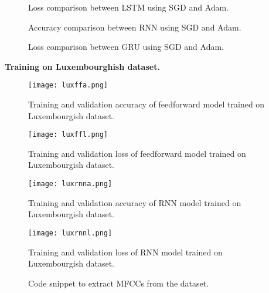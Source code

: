     \begin{figure}[H]
      \centering
      \qquad
      \caption{Loss comparison between LSTM using SGD and Adam.}%
      \label{lstml}
    \end{figure}
    \begin{figure}[H]
      \centering
      \qquad
      \caption{Accuracy comparison between RNN using SGD and Adam.}%
      \label{grua}
    \end{figure}
    \begin{figure}[H]
      \centering
      \qquad
      \caption{Loss comparison between GRU using SGD and Adam.}%
      \label{grul}
    \end{figure}

 \newpage

\textbf{Training on Luxembourghish dataset.}\\
\begin{figure}[h]
  \centering
  \texttt{[image: luxffa.png]}
  \caption{Training and validation accuracy of feedforward model trained on
  Luxembourgish dataset.}
  \label{grua}
\end{figure}

\begin{figure}[h]
  \centering
  \texttt{[image: luxffl.png]}
  \caption{Training and validation loss of feedforward model trained on
  Luxembourgish dataset.}
  \label{grul}
\end{figure}

\begin{figure}[h]
  \centering
  \texttt{[image: luxrnna.png]}
  \caption{Training and validation accuracy of RNN model trained on
  Luxembourgish dataset.}
  \label{grua}
\end{figure}

\begin{figure}[h]
  \centering
  \texttt{[image: luxrnnl.png]}
  \caption{Training and validation loss of RNN model trained on Luxembourgish
  dataset.}
\end{figure}

\begin{figure}[h]
  \centering
  
  \caption{Code snippet to extract MFCCs from the dataset.}
  \label{mfccsnip}
\end{figure}
